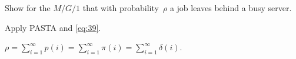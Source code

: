 \begin{exercise}\label{ex:28}
Show for the $M/G/1$  that  with probability~$\rho$ a job leaves behind a busy server.
\begin{hint}
 Apply PASTA and \cref{eq:39}.
\end{hint}
\begin{solution}
$\rho = \sum_{i=1}^\infty p(i) = \sum_{i=1}^\infty \pi(i) = \sum_{i=1}^\infty \delta(i)$.
\end{solution}
\end{exercise}



